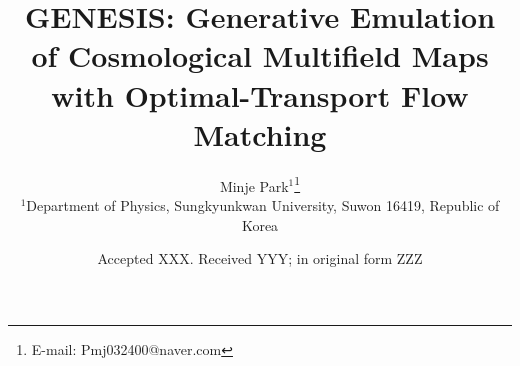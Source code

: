 \documentclass[usenatbib]{mnras}
\title[GENESIS: Flow-Based Cosmological Emulator]{
GENESIS: Generative Emulation of Cosmological Multifield Maps with
Optimal-Transport Flow Matching
}
\author[M. Park]{%
Minje Park$^{1}$\thanks{E-mail: Pmj032400@naver.com}
\\
$^{1}$Department of Physics, Sungkyunkwan University, Suwon 16419, Republic of Korea
}
\date{Accepted XXX. Received YYY; in original form ZZZ}
\newcommand{\Om}{\Omega_{\rm m}}
\newcommand{\sig}{\sigma_8}
\begin{document}
\maketitle
\makeatletter
\gdef\@journal{\makebox[\textwidth]{\hfill Preprint \tod@y\hfill
  Compiled using MNRAS \LaTeX\ style file v\@version}}
\def\ps@titlepage{\let\@mkboth\@gobbletwo
 \def\@oddhead{\footnotesize\@journal}
 \def\@oddfoot{}
 \def\@evenhead{\footnotesize\@journal\hfill}
 \def\@evenfoot{}
 \def\sectionmark##1{}
 \def\subsectionmark##1{}}
\thispagestyle{titlepage}
\def\ps@headings{\let\@mkboth\markboth
 \def\@oddhead{\Large\hfill{\it\@shorttitle}\hspace{1.5em}%
   \rm\@ddell\thepage}
 \def\@oddfoot{}
 \def\@evenhead{\Large\@ddell\thepage\hspace{1.5em}\it\@shortauthor\hfill}
 \def\@evenfoot{}
 \def\sectionmark##1{\markboth{##1}{}}
 \def\subsectionmark##1{\markright{##1}}}
\def\ps@myheadings{\let\@mkboth\@gobbletwo
 \def\@oddhead{\Large\hfill\it\rightmark\hspace{1.5em}\rm\@ddell\thepage}
 \def\@oddfoot{}
 \def\@evenhead{\Large\@ddell\thepage\hspace{1.5em}\it\leftmark\hfill}
 \def\@evenfoot{}
 \def\sectionmark##1{}
 \def\subsectionmark##1{}}
\ps@headings
\makeatother


\end{document}
